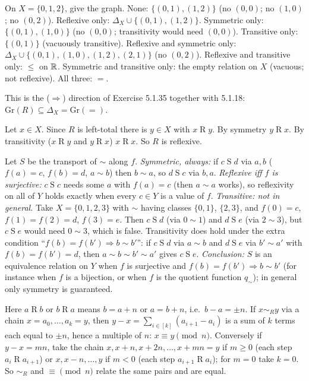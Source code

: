  On $X=\{0,1,2\}$, give the graph. None: $\{(0,1),(1,2)\}$ (no $(0,0)$; no $(1,0)$; no $(0,2)$). Reflexive only: $\Delta_X\cup\{(0,1),(1,2)\}$. Symmetric only: $\{(0,1),(1,0)\}$ (no $(0,0)$; transitivity would need $(0,0)$). Transitive only: $\{(0,1)\}$ (vacuously transitive). Reflexive and symmetric only: $\Delta_X\cup\{(0,1),(1,0),(1,2),(2,1)\}$ (no $(0,2)$). Reflexive and transitive only: $\le$ on $\mathbb{R}$. Symmetric and transitive only: the empty relation on $X$ (vacuous; not reflexive). All three: $=$.

 This is the ($\Rightarrow$) direction of Exercise 5.1.35 together with 5.1.18: $\mathrm{Gr}(R)\subseteq\Delta_X=\mathrm{Gr}(=)$.

 Let $x\in X$. Since $R$ is left-total there is $y\in X$ with $x\mathrel Ry$. By symmetry $y\mathrel Rx$. By transitivity ($x\mathrel Ry$ and $y\mathrel Rx$) $x\mathrel Rx$. So $R$ is reflexive.

 Let $S$ be the transport of $\sim$ along $f$. \emph{Symmetric, always:} if $c\mathrel Sd$ via $a,b$ ($f(a)=c$, $f(b)=d$, $a\sim b$) then $b\sim a$, so $d\mathrel Sc$ via $b,a$. \emph{Reflexive iff $f$ is surjective:} $c\mathrel Sc$ needs some $a$ with $f(a)=c$ (then $a\sim a$ works), so reflexivity on all of $Y$ holds exactly when every $c\in Y$ is a value of $f$. \emph{Transitive: not in general.} Take $X=\{0,1,2,3\}$ with $\sim$ having classes $\{0,1\}$, $\{2,3\}$, and $f(0)=c$, $f(1)=f(2)=d$, $f(3)=e$. Then $c\mathrel Sd$ (via $0\sim1$) and $d\mathrel Se$ (via $2\sim3$), but $c\mathrel Se$ would need $0\sim3$, which is false. Transitivity does hold under the extra condition ``$f(b)=f(b')\Rightarrow b\sim b'$'': if $c\mathrel Sd$ via $a\sim b$ and $d\mathrel Se$ via $b'\sim a'$ with $f(b)=f(b')=d$, then $a\sim b\sim b'\sim a'$ gives $c\mathrel Se$. \emph{Conclusion:} $S$ is an equivalence relation on $Y$ when $f$ is surjective and $f(b)=f(b')\Rightarrow b\sim b'$ (for instance when $f$ is a bijection, or when $f$ is the quotient function $q_\sim$); in general only symmetry is guaranteed.

 Here $a\mathrel Rb$ or $b\mathrel Ra$ means $b=a+n$ or $a=b+n$, i.e.\ $b-a=\pm n$. If $x\sim_Ry$ via a chain $x=a_0,\dots,a_k=y$, then $y-x=\sum_{i\in[k]}(a_{i+1}-a_i)$ is a sum of $k$ terms each equal to $\pm n$, hence a multiple of $n$: $x\equiv y\pmod n$. Conversely if $y-x=mn$, take the chain $x,x+n,x+2n,\dots,x+mn=y$ if $m\ge0$ (each step $a_i\mathrel Ra_{i+1}$) or $x,x-n,\dots,y$ if $m<0$ (each step $a_{i+1}\mathrel Ra_i$); for $m=0$ take $k=0$. So $\sim_R$ and $\equiv\pmod n$ relate the same pairs and are equal.


